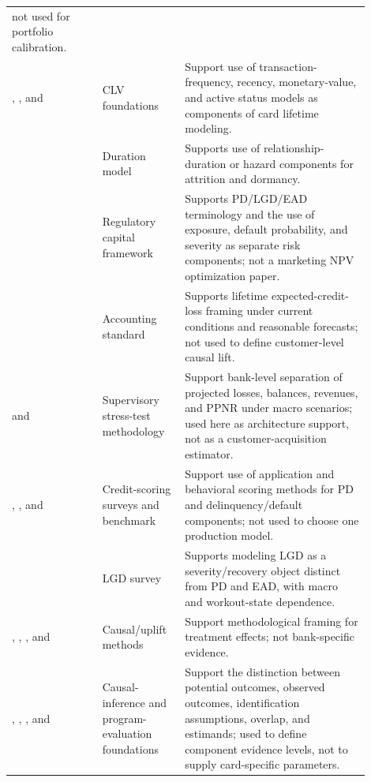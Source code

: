 \documentclass[11pt]{article}
\newcommand{\1}{\mathbf{1}}
\begin{document}
\begin{longtable}{p{0.23\linewidth}p{0.20\linewidth}p{0.47\linewidth}}
    not used for portfolio calibration. \\
\citet{schmittlein1987counting}, \citet{fader2005bgnbd}, and \citet{fader2005rfm}
  & CLV foundations
  & Support use of transaction-frequency, recency, monetary-value, and active
    status models as components of card lifetime modeling. \\
\citet{bolton1998duration}
  & Duration model
  & Supports use of relationship-duration or hazard components for attrition
    and dormancy. \\
\citet{bcbs2006basel}
  & Regulatory capital framework
  & Supports PD/LGD/EAD terminology and the use of exposure, default
    probability, and severity as separate risk components; not a marketing NPV
    optimization paper. \\
\citet{fasb2016asu201613}
  & Accounting standard
  & Supports lifetime expected-credit-loss framing under current conditions
    and reasonable forecasts; not used to define customer-level causal lift. \\
\citet{federalreserve2025stressmethodology} and
\citet{federalreserve2026stressmethodology}
  & Supervisory stress-test methodology
  & Support bank-level separation of projected losses, balances, revenues, and
    PPNR under macro scenarios; used here as architecture support, not as a
    customer-acquisition estimator. \\
\citet{hand1997credit}, \citet{thomas2000survey}, and
\citet{lessmann2015benchmarking}
  & Credit-scoring surveys and benchmark
  & Support use of application and behavioral scoring methods for PD and
    delinquency/default components; not used to choose one production model. \\
\citet{schuermann2004lgd}
  & LGD survey
  & Supports modeling LGD as a severity/recovery object distinct from PD and
    EAD, with macro and workout-state dependence. \\
\citet{rosenbaum1983propensity}, \citet{lo2002true},
\citet{wager2018causalforests}, and \citet{chernozhukov2018dml}
  & Causal/uplift methods
  & Support methodological framing for treatment effects; not bank-specific
    evidence. \\
\citet{imbensrubin2015causal}, \citet{angrist2009mostlyharmless},
\citet{imbenswooldridge2009recent}, and \citet{hernanrobins2020causal}
  & Causal-inference and program-evaluation foundations
  & Support the distinction between potential outcomes, observed outcomes,
    identification assumptions, overlap, and estimands; used to define
    component evidence levels, not to supply card-specific parameters. \\

\end{longtable}
\end{document}
